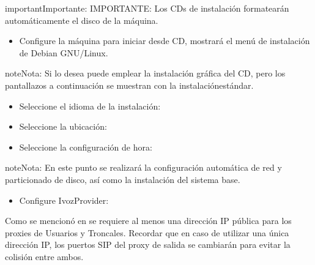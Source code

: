 \documentclass[letterpaper,10pt,spanish]{sphinxmanual}
\begin{document}
\begin{notice}{important}{Importante:}
IMPORTANTE: Los CDs de instalación formatearán automáticamente el disco de la máquina.
\end{notice}
\begin{itemize}
\item {} 
Configure la máquina para iniciar desde CD, mostrará el menú de instalación de Debian GNU/Linux.

\end{itemize}

\begin{notice}{note}{Nota:}
Si lo desea puede emplear la instalación gráfica del CD, pero los pantallazos a continuación se muestran con la instalaciónestándar.
\end{notice}

\noindent{}
\begin{itemize}
\item {} 
Seleccione el idioma de la instalación:

\end{itemize}

\noindent{}
\begin{itemize}
\item {} 
Seleccione la ubicación:

\end{itemize}

\noindent{}
\begin{itemize}
\item {} 
Seleccione la configuración de hora:

\end{itemize}

\noindent{}

\begin{notice}{note}{Nota:}
En este punto se realizará la configuración automática de red y particionado de disco, así como la instalación del sistema base.
\end{notice}
\begin{itemize}
\item {} 
Configure IvozProvider:

\end{itemize}

\noindent{}

Como se mencionó en {\hyperref[installation/requirements:minimum\string-requirements]{}} se requiere al menos una dirección IP pública para los proxies de Usuarios y Troncales. Recordar que en caso de utilizar una única dirección IP, los puertos SIP del proxy de salida se cambiarán para evitar la colisión entre ambos.
\end{document}
